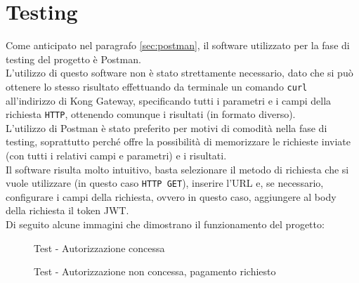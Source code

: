 \chapter{Testing}\label{chapter:testing}
Come anticipato nel paragrafo \ref{sec:postman}, il software utilizzato per la fase di testing del progetto è Postman.\\
L'utilizzo di questo software non è stato strettamente necessario, dato che si può ottenere lo stesso risultato effettuando da terminale un comando \texttt{curl} all'indirizzo di Kong Gateway, specificando tutti i parametri e i campi della richiesta \texttt{HTTP}, ottenendo comunque i risultati (in formato diverso).\\
L'utilizzo di Postman è stato preferito per motivi di comodità nella fase di testing, soprattutto perché offre la possibilità di memorizzare le richieste inviate (con tutti i relativi campi e parametri) e i risultati.\\
Il software risulta molto intuitivo, basta selezionare il metodo di richiesta che si vuole utilizzare (in questo caso \texttt{HTTP GET}), inserire l'URL e, se necessario, configurare i campi della richiesta, ovvero in questo caso, aggiungere al body della richiesta il token JWT.\\

Di seguito alcune immagini che dimostrano il funzionamento del progetto:\\
\begin{figure}[h]
	\centering
	\caption{Test - Autorizzazione concessa}
	\label{fig:one}
\end{figure}

\begin{figure}[h]
	\centering
	\caption{Test - Autorizzazione non concessa, pagamento richiesto}
	\label{fig:one}
\end{figure}

